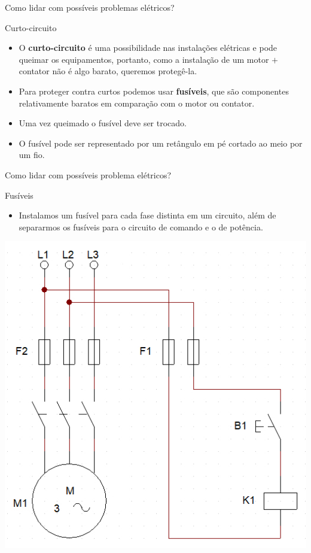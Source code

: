 \begin{frame}{Como lidar com possíveis problemas elétricos?}
\begin{block}{Curto-circuito}
    \begin{itemize}
        \item O \textbf{curto-circuito} é uma possibilidade nas instalações elétricas e pode queimar os equipamentos, portanto, como a instalação de um motor $ + $ contator não é algo barato, queremos protegê-la.
        \item Para proteger contra curtos podemos usar \textbf{fusíveis}, que são componentes relativamente baratos em comparação com o motor ou contator.
        \item Uma vez queimado o fusível deve ser trocado.
        \item O fusível pode ser representado por um retângulo em pé cortado ao meio por um fio.
    \end{itemize}
\end{block}
\begin{center}
\end{center}
\end{frame}

\begin{frame}{Como lidar com possíveis problema elétricos?}
\begin{block}{Fusíveis}
	\begin{itemize}
		\item Instalamos um fusível para cada fase distinta em um circuito, além de separarmos os fusíveis para o circuito de comando e o de potência.
	\end{itemize}
\end{block}
\centerline{\includegraphics[height=0.6\textheight]{Figuras/Ch05/fig9.jpg}}
\end{frame}

